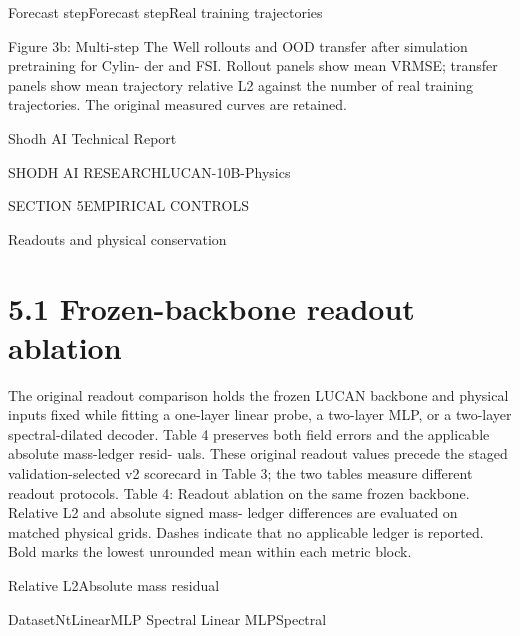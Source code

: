 \documentclass[11pt]{article}
\begin{document}
\par


\noindent Forecast step\quad Forecast step\quad Real training trajectories\par





Figure 3b: Multi-step The Well rollouts and OOD transfer after simulation pretraining for Cylin-
der and FSI. Rollout panels show mean VRMSE; transfer panels show mean trajectory relative L2
against the number of real training trajectories. The original measured curves are retained.





\noindent Shodh AI Technical Report\par




\noindent SHODH AI RESEARCH\quad LUCAN-10B-Physics\par




\noindent SECTION 5\quad EMPIRICAL CONTROLS\par


Readouts and physical conservation


\section*{5.1 Frozen-backbone readout ablation}

The original readout comparison holds the frozen LUCAN backbone and physical inputs
fixed while fitting a one-layer linear probe, a two-layer MLP, or a two-layer spectral-dilated
decoder. Table 4 preserves both field errors and the applicable absolute mass-ledger resid-
uals. These original readout values precede the staged validation-selected v2 scorecard in
Table 3; the two tables measure different readout protocols.
Table 4: Readout ablation on the same frozen backbone. Relative L2 and absolute signed mass-
ledger differences are evaluated on matched physical grids. Dashes indicate that no applicable
ledger is reported. Bold marks the lowest unrounded mean within each metric block.


\noindent Relative L2\quad Absolute mass residual\par


\noindent Dataset\quad N\quad t\quad Linear\quad MLP Spectral Linear MLP\quad Spectral\par
\end{document}
